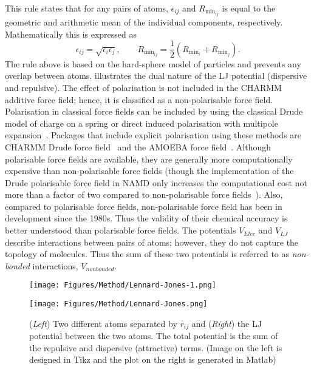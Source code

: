 This rule states that for any pairs of atoms, $\epsilon_{ij}$ and $R_{\text{min}_{ij}}$ is 
equal to the geometric and arithmetic mean of the individual components, respectively. 
Mathematically this is expressed as 
\begin{equation}
\epsilon_{ij} = \sqrt{\epsilon_{i}\epsilon_{j}},\quad\quad R_{\text{min}_{ij}} = \frac{1}{2} (R_{\text{min}_{i}} + R_{\text{min}_{j}}).
\end{equation}
The rule above is based on the hard-sphere model of particles and prevents any overlap 
between atoms.  illustrates the dual nature of the LJ potential (dispersive 
and repulsive). The effect of polarisation is not included in the CHARMM additive force field; 
hence, it is classified as a non-polarisable force field. Polarisation in classical force fields 
can be included by using the classical Drude model of charge on a spring or direct induced 
polarisation with multipole expansion~\cite{Baker2015}. Packages that include explicit 
polarisation using these methods are CHARMM Drude force field~\cite{Lopes2013} and the AMOEBA 
force field~\cite{Ponder2010}. Although polarisable force fields are available, they are 
generally more computationally expensive than non-polarisable force fields (though the implementation 
of the Drude polarisable force field in NAMD only increases the computational cost not more than 
a factor of two compared to non-polarisable force fields~\cite{Jiang2011a}). 
Also, compared to  polarisable force fields, non-polarisable force field has been in development 
since the 1980s. Thus the validity of their chemical accuracy is better understood than polarisable 
force fields. The potentials $V_{Elec}$ and $V_{LJ}$ describe interactions between pairs of atoms; 
however, they do not capture the topology of molecules. Thus the sum of these two potentials is 
referred to as {\it non-bonded} interactions, $V_{nonbonded}$. 
\begin{figure}[t!]
\centering
\begin{minipage}{0.4\textwidth}
\centering
\texttt{[image: Figures/Method/Lennard-Jones-1.png]}
\end{minipage}
\begin{minipage}{0.5\textwidth}
\centering
\texttt{[image: Figures/Method/Lennard-Jones.png]}
\end{minipage}
\caption{(\textit{Left}) Two different atoms separated by $r_{ij}$ and (\textit{Right}) 
the LJ potential between the two atoms. The total potential is the sum of the repulsive 
and dispersive (attractive) terms. (Image on the left is designed in Tikz and the plot 
on the right is generated in Matlab)}
\label{method:LJ}
\end{figure}

